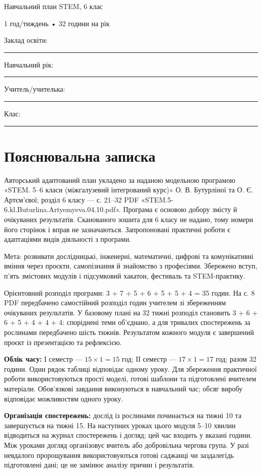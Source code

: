 \documentclass[10pt,a4paper,landscape]{article}
\begin{document}
{\LARGE\color{accent} Навчальний план STEM, 6 клас}

{\large 1 год/тиждень • 32 години на рік}

Заклад освіти: \rule{90mm}{0.3pt}\quad Навчальний рік: \rule{30mm}{0.3pt}

Учитель/учителька: \rule{95mm}{0.3pt}\quad Клас: \rule{25mm}{0.3pt}
\section*{Пояснювальна записка}
Авторський адаптований план укладено за наданою модельною програмою «STEM. 5--6 класи (міжгалузевий інтегрований курс)» О. В. Бутурліної та О. Є. Артєм’євої; розділ 6 класу — с. 21--32 PDF «STEM.5-6.kl.Buturlina.Artyemyeva.04.10.pdf». Програма є основою добору змісту й очікуваних результатів. Сканованого зошита для 6 класу не надано, тому номери його сторінок і вправ не зазначаються. Запропоновані практичні роботи є адаптаціями видів діяльності з програми.

Мета: розвивати дослідницькі, інженерні, математичні, цифрові та комунікативні вміння через проєкти, самопізнання й знайомство з професіями. Збережено вступ, п’ять змістових модулів і підсумковий хакатон, фестиваль та STEM-практику.

Орієнтовний розподіл програми: 3 + 7 + 5 + 6 + 5 + 5 + 4 = 35 годин. На с. 8 PDF передбачено самостійний розподіл годин учителем зі збереженням очікуваних результатів. У базовому плані на 32 тижні розподіл становить 3 + 6 + 6 + 5 + 4 + 4 + 4: споріднені теми об’єднано, а для тривалих спостережень за рослинами передбачено шість тижнів. Результатом кожного модуля є завершений проєкт із презентацією та рефлексією.

\textbf{Облік часу:} І семестр — $15\times1=15$ год; ІІ семестр — $17\times1=17$ год; разом 32 години. Один рядок таблиці відповідає одному уроку. Для збереження практичної роботи використовуються прості моделі, готові шаблони та підготовлені вчителем матеріали. Обов’язкові завдання виконуються в навчальний час; обсяг виробу відповідає можливостям одного уроку.

\textbf{Організація спостережень:} дослід із рослинами починається на тижні 10 та завершується на тижні 15. На наступних уроках цього модуля 5--10 хвилин відводиться на журнал спостережень і догляд; цей час входить у вказані години. Між уроками догляд організовує вчитель або добровільна чергова група. У разі невдалого пророщування використовуються готові саджанці чи заздалегідь підготовлені дані; це не замінює аналізу причин і результатів.
\end{document}
